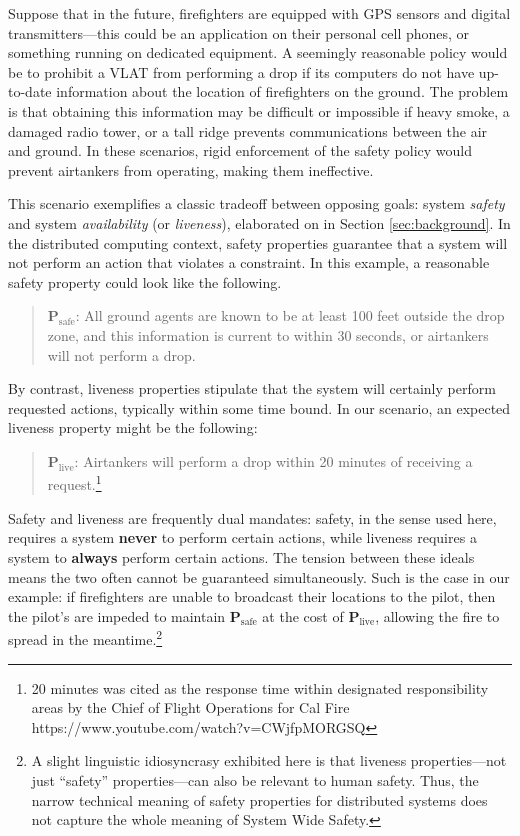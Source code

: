 \documentclass[]             %
{NASA}                       %
\theoremstyle{definition}
\begin{document}
Suppose that in the future, firefighters are equipped with GPS sensors
and digital transmitters---this could be an application on their
personal cell phones, or something running on dedicated equipment. A
seemingly reasonable policy would be to prohibit a VLAT from
performing a drop if its computers do not have up-to-date information
about the location of firefighters on the ground. The problem is that
obtaining this information may be difficult or impossible if heavy
smoke, a damaged radio tower, or a tall ridge prevents communications
between the air and ground. In these scenarios, rigid enforcement of
the safety policy would prevent airtankers from operating, making them
ineffective.

This scenario exemplifies a classic tradeoff between opposing goals:
system \emph{safety} and system \emph{availability} (or
\emph{liveness}), elaborated on in Section \ref{sec:background}. In the
distributed computing context, safety properties guarantee that a system
will not perform an action that violates a constraint. In this example,
a reasonable safety property could look like the following.

\begin{quote}
  $\textbf{P}_\textrm{safe}$: All ground agents are known to be at
  least 100 feet outside the drop zone, and this information is
  current to within 30 seconds, or airtankers will not perform a drop.
\end{quote}

\noindent By contrast, liveness properties stipulate that the system
will certainly perform requested actions, typically within some time
bound. In our scenario, an expected liveness property might be the
following:

\begin{quote}
  $\textbf{P}_\textrm{live}$:
  Airtankers will perform a drop within 20 minutes of receiving a request.\footnote{20 minutes was cited as the response time within designated responsibility areas by the Chief of Flight Operations for Cal Fire https://www.youtube.com/watch?v=CWjfpMORGSQ}
\end{quote}

Safety and liveness are frequently dual mandates: safety, in the sense
used here, requires a system \textbf{never} to perform certain
actions, while liveness requires a system to \textbf{always} perform
certain actions. The tension between these ideals means the two often
cannot be guaranteed simultaneously. Such is the case in our example:
if firefighters are unable to broadcast their locations to the pilot,
then the pilot's are impeded to maintain \(\textbf{P}_\textrm{safe}\)
at the cost of \(\textbf{P}_\textrm{live}\), allowing the fire to
spread in the meantime.\footnote{A slight linguistic idiosyncrasy
exhibited here is that liveness properties---not just ``safety''
properties---can also be relevant to human safety. Thus, the narrow
technical meaning of safety properties for distributed systems does
not capture the whole meaning of System Wide Safety.}
\end{document}
